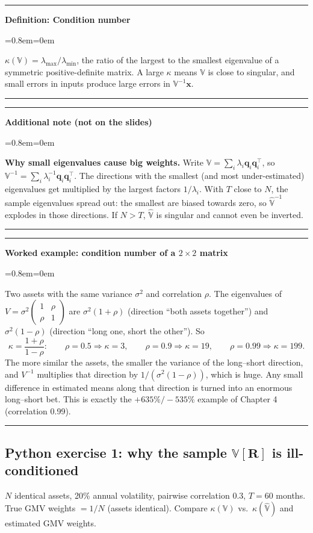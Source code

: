 \documentclass[11pt,a4paper]{report}
\newenvironment{notebox}[1]
  {\par\medskip\Needspace{6\baselineskip}\noindent\rule{\linewidth}{0.4pt}\par\nopagebreak
   \noindent\textbf{#1}\par\nopagebreak
   \begin{list}{}{\leftmargin=0.8em\rightmargin=0em\topsep=2pt}\item[]}
  {\end{list}\nopagebreak\noindent\rule{\linewidth}{0.4pt}\par\medskip}
\newenvironment{definitionbox}[1]{\begin{notebox}{Definition: #1}}{\end{notebox}}
\newenvironment{addnote}{\begin{notebox}{Additional note (not on the slides)}}{\end{notebox}}
\newenvironment{workedex}[1][]{\begin{notebox}{Worked example#1}}{\end{notebox}}
\newcommand{\V}{\mathbb{V}}
\newcommand{\R}{\bm{R}}
\newcommand{\T}{^{\top}}
\begin{document}
\begin{definitionbox}{Condition number}
$\kappa(\V)=\lambda_{\max}/\lambda_{\min}$, the ratio of the largest to the
smallest eigenvalue of a symmetric positive-definite matrix. A large $\kappa$
means $\V$ is close to singular, and small errors in inputs produce large
errors in $\V^{-1}\bm{x}$.
\end{definitionbox}

\begin{addnote}
\textbf{Why small eigenvalues cause big weights.} Write $\V=\sum_i\lambda_i
\bm{q}_i\bm{q}_i\T$, so $\V^{-1}=\sum_i\lambda_i^{-1}\bm{q}_i\bm{q}_i\T$. The
directions with the smallest (and most under-estimated) eigenvalues get
multiplied by the largest factors $1/\lambda_i$. With $T$ close to $N$, the
sample eigenvalues spread out: the smallest are biased towards zero, so
$\widehat{\V}^{-1}$ explodes in those directions. If $N>T$, $\widehat{\V}$ is
singular and cannot even be inverted.
\end{addnote}


\begin{workedex}[: condition number of a $2\times2$ matrix]
Two assets with the same variance $\sigma^2$ and correlation $\rho$. The
eigenvalues of $V=\sigma^2\begin{pmatrix}1&\rho\\\rho&1\end{pmatrix}$ are
$\sigma^2(1+\rho)$ (direction ``both assets together'') and $\sigma^2(1-\rho)$
(direction ``long one, short the other''). So
\[
\kappa=\frac{1+\rho}{1-\rho}:\qquad \rho=0.5\Rightarrow\kappa=3,\qquad
\rho=0.9\Rightarrow\kappa=19,\qquad \rho=0.99\Rightarrow\kappa=199 .
\]
The more similar the assets, the smaller the variance of the long--short
direction, and $V^{-1}$ multiplies that direction by $1/(\sigma^2(1-\rho))$, which is
huge. Any small difference in estimated means along that direction is turned into
an enormous long--short bet. This is exactly the $+635\%/-535\%$ example of
Chapter 4 (correlation 0.99).
\end{workedex}
\subsection*{Python exercise 1: why the sample $\V[\R]$ is ill-conditioned}
$N$ identical assets, 20\% annual volatility, pairwise correlation 0.3,
$T=60$ months. True GMV weights $=1/N$ (assets identical). Compare
$\kappa(\V)$ vs.\ $\kappa(\widehat{\V})$ and estimated GMV weights.
\end{document}
